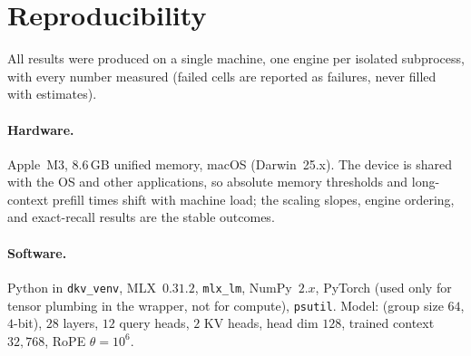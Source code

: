 \section{Reproducibility}
\label{app:repro}

All results were produced on a single machine, one engine per isolated subprocess, with every
number measured (failed cells are reported as failures, never filled with estimates).

\paragraph{Hardware.}
Apple~M3, $8.6$\,GB unified memory, macOS (Darwin~25.x). The device is shared with the OS and
other applications, so absolute memory thresholds and long-context prefill times shift with
machine load; the scaling slopes, engine ordering, and exact-recall results are the stable
outcomes.

\begin{sloppypar}
\paragraph{Software.}
Python in \texttt{dkv\_venv}, MLX~$0.31.2$, \texttt{mlx\_lm}, NumPy~$2.x$,
PyTorch (used only for tensor plumbing in the wrapper, not for compute),
\texttt{psutil}. Model: 
(group size $64$, $4$-bit), $28$ layers, $12$ query heads, $2$ KV heads, head
dim $128$, trained context $32{,}768$, RoPE $\theta=10^6$.
\end{sloppypar}

